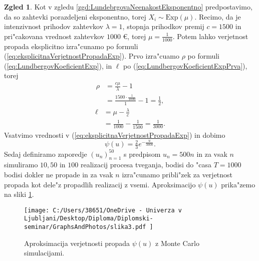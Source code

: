 \documentclass[12pt, a4paper, reqno]{amsart}
\theoremstyle{definition}
\newtheorem{zgled}[definicija]{Zgled}
\theoremstyle{plain}
\newcommand{\1}{\mathds{1}}
\begin{document}
            \begin{zgled}
                Kot v zgledu \ref{zgd:LundebrgovaNeenakostEksponentno} predpostavimo, da so 
                zahtevki porazdeljeni eksponentno, torej $X_i\sim\text{Exp}(\mu)$. Recimo, da je intenzivnost 
                prihodov zahtevkov $\lambda = 1$, stopnja prihodkov premij $c = 1500$ in 
                pri"cakovana vrednost zahtevkov $1000$ \euro, torej 
                $\mu = \tfrac{1}{1000}$. Potem lahko verjetnost propada eksplicitno izra"cunamo po 
                formuli (\ref{eq:eksplicitnaVerjetnostPropadaExp}). Prvo izra"cuamo $\rho$ po formuli
                (\ref{eq:LundbergovKoeficientExp}), in $\ell$ po (\ref{eq:LundbergovKoeficientExpPrva}), torej
                \begin{align*}
                    \rho &= \frac{c\mu}{\lambda} - 1\\
                         &= \frac{1500\cdot\tfrac{1}{1000}}{1} - 1 = \frac{1}{2},
                \end{align*}
                \begin{align*}
                    \ell &= \mu - \frac{\lambda}{c} \\
                         &= \frac{1}{1000} - \frac{1}{1500} = \frac{1}{3000}.
                \end{align*}
                Vsatvimo vrednosti v (\ref{eq:eksplicitnaVerjetnostPropadaExp}) in dobimo
                \begin{equation*}
                    \psi(u) = \tfrac{2}{3}e^{-\frac{u}{3000}}.
                \end{equation*}
                Sedaj definiramo zaporedje $(u_n)_{n = 1}^{50}$ s predpisom $u_n = 500n$ in za vsak $n$
                simuliramo $10, 50$ in $100$ realizacij procesa tveganja, bodisi do "casa $T = 1000$ bodisi dokler
                ne propade in za vsak $n$ izra"cunamo pribli"zek za verjetnost propada kot dele"z propadlih 
                realizacij z vsemi. Aproksimacijo $\psi(u)$ prika"zemo na sliki \ref{fig:slika4}.

                \begin{figure}[H]
                    \centering
                    \texttt{[image: 
                        C:/Users/38651/OneDrive - Univerza v Ljubljani/Desktop/Diploma/Diplomski-seminar/GraphsAndPhotos/slika3.pdf
                        ]}
                    \caption{Aproksimacija verjetnosti propada $\psi(u)$ z Monte Carlo simulacijami.}
                    \label{fig:slika4}
                \end{figure}


\end{zgled}
\end{document}
